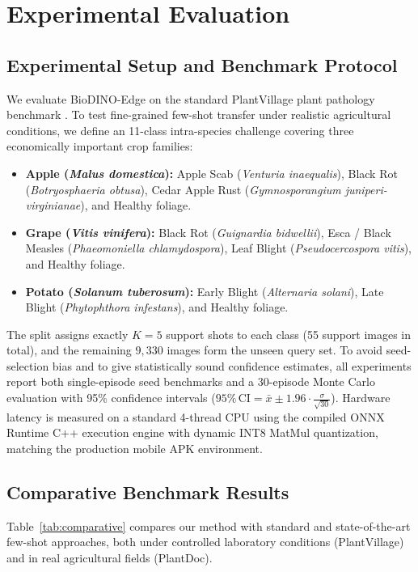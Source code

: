 \documentclass[conference]{IEEEtran}
\begin{document}
\section{Experimental Evaluation}

\subsection{Experimental Setup and Benchmark Protocol}
We evaluate BioDINO-Edge on the standard PlantVillage plant pathology benchmark \cite{hughes2012plantvillage}. To test fine-grained few-shot transfer under realistic agricultural conditions, we define an 11-class intra-species challenge covering three economically important crop families:
\begin{itemize}
    \item \textbf{Apple (\textit{Malus domestica}):} Apple Scab (\textit{Venturia inaequalis}), Black Rot (\textit{Botryosphaeria obtusa}), Cedar Apple Rust (\textit{Gymnosporangium juniperi-virginianae}), and Healthy foliage.
    \item \textbf{Grape (\textit{Vitis vinifera}):} Black Rot (\textit{Guignardia bidwellii}), Esca / Black Measles (\textit{Phaeomoniella chlamydospora}), Leaf Blight (\textit{Pseudocercospora vitis}), and Healthy foliage.
    \item \textbf{Potato (\textit{Solanum tuberosum}):} Early Blight (\textit{Alternaria solani}), Late Blight (\textit{Phytophthora infestans}), and Healthy foliage.
\end{itemize}
The split assigns exactly $K=5$ support shots to each class (55 support images in total), and the remaining $9,330$ images form the unseen query set. To avoid seed-selection bias and to give statistically sound confidence estimates, all experiments report both single-episode seed benchmarks and a 30-episode Monte Carlo evaluation with 95\% confidence intervals ($95\%\,\text{CI} = \bar{x} \pm 1.96 \cdot \frac{\sigma}{\sqrt{30}}$). Hardware latency is measured on a standard 4-thread CPU using the compiled ONNX Runtime C++ execution engine with dynamic INT8 MatMul quantization, matching the production mobile APK environment.

\subsection{Comparative Benchmark Results}
Table~\ref{tab:comparative} compares our method with standard and state-of-the-art few-shot approaches, both under controlled laboratory conditions (PlantVillage) and in real agricultural fields (PlantDoc).
\end{document}
